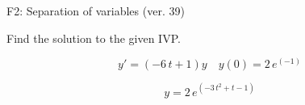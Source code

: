 \begin{exercise}
  \begin{exerciseTitle}F2: Separation of variables (ver. 39)\end{exerciseTitle}
  \begin{exerciseStatement}
    
Find the solution to the given IVP.

    
\[y'=( -6 \, t + 1 )y\hspace{1em} y(0)= 2 \, e^{\left(-1\right)}\]

  \end{exerciseStatement}
  \begin{exerciseAnswer}
    
\[y= 2 \, e^{\left(-3 \, t^{2} + t - 1\right)}\]

  \end{exerciseAnswer}
\end{exercise}